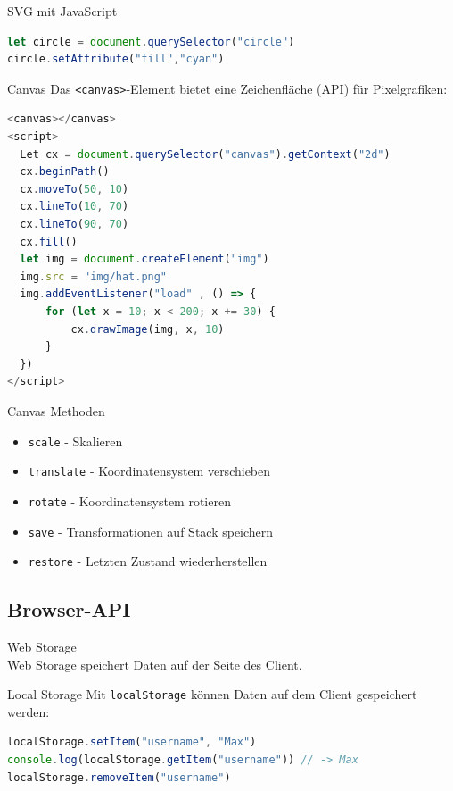 \begin{examplecode}{SVG mit JavaScript}
\begin{lstlisting}[language=JavaScript, style=basesmol]
let circle = document.querySelector("circle")
circle.setAttribute("fill","cyan")
\end{lstlisting}
\end{examplecode}


\begin{definition}{Canvas}
  Das \texttt{<canvas>}-Element bietet eine Zeichenfläche (API) für Pixelgrafiken:
\begin{lstlisting}[language=JavaScript, style=basesmol]
<canvas></canvas>
<script>
  Let cx = document.querySelector("canvas").getContext("2d")
  cx.beginPath()
  cx.moveTo(50, 10)
  cx.lineTo(10, 70)
  cx.lineTo(90, 70)
  cx.fill()
  let img = document.createElement("img")
  img.src = "img/hat.png"
  img.addEventListener("load" , () => {
      for (let x = 10; x < 200; x += 30) {
          cx.drawImage(img, x, 10)
      }
  })
</script>
\end{lstlisting}
\end{definition}


\begin{code}{Canvas Methoden}
  \begin{itemize}
    \item \texttt{scale} - Skalieren
    \item \texttt{translate} - Koordinatensystem verschieben
    \item \texttt{rotate} - Koordinatensystem rotieren
    \item \texttt{save} - Transformationen auf Stack speichern
    \item \texttt{restore} - Letzten Zustand wiederherstellen
  \end{itemize}  
\end{code}


\subsection{Browser-API}
Web Storage\\
Web Storage speichert Daten auf der Seite des Client.

\begin{definition}{Local Storage}
Mit \texttt{localStorage} können Daten auf dem Client gespeichert werden:
\begin{lstlisting}[language=JavaScript, style=basesmol]
localStorage.setItem("username", "Max")
console.log(localStorage.getItem("username")) // -> Max
localStorage.removeItem("username")
\end{lstlisting}
\end{definition}

